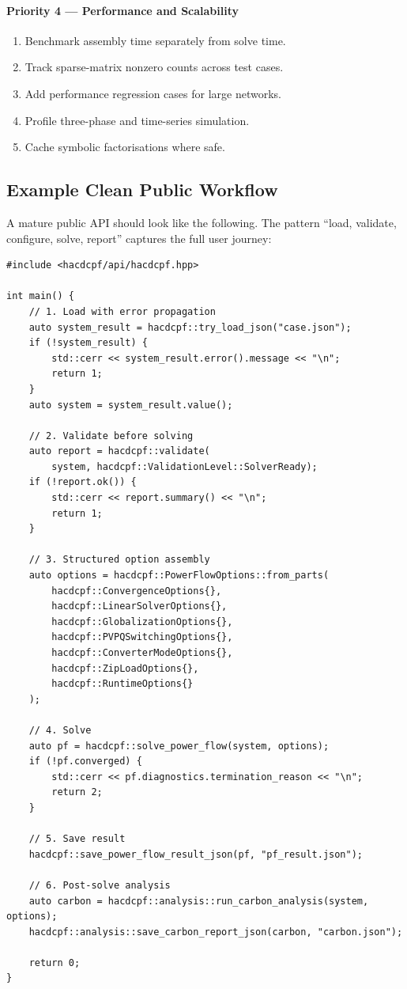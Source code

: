 \paragraph{Priority 4 --- Performance and Scalability}
\begin{enumerate}
  \item Benchmark assembly time separately from solve time.
  \item Track sparse-matrix nonzero counts across test cases.
  \item Add performance regression cases for large networks.
  \item Profile three-phase and time-series simulation.
  \item Cache symbolic factorisations where safe.
\end{enumerate}

\subsection{Example Clean Public Workflow}
\label{sec:example-workflow}

A mature public API should look like the following.  The pattern
``load, validate, configure, solve, report'' captures the full user
journey:

\begin{verbatim}
#include <hacdcpf/api/hacdcpf.hpp>

int main() {
    // 1. Load with error propagation
    auto system_result = hacdcpf::try_load_json("case.json");
    if (!system_result) {
        std::cerr << system_result.error().message << "\n";
        return 1;
    }
    auto system = system_result.value();

    // 2. Validate before solving
    auto report = hacdcpf::validate(
        system, hacdcpf::ValidationLevel::SolverReady);
    if (!report.ok()) {
        std::cerr << report.summary() << "\n";
        return 1;
    }

    // 3. Structured option assembly
    auto options = hacdcpf::PowerFlowOptions::from_parts(
        hacdcpf::ConvergenceOptions{},
        hacdcpf::LinearSolverOptions{},
        hacdcpf::GlobalizationOptions{},
        hacdcpf::PVPQSwitchingOptions{},
        hacdcpf::ConverterModeOptions{},
        hacdcpf::ZipLoadOptions{},
        hacdcpf::RuntimeOptions{}
    );

    // 4. Solve
    auto pf = hacdcpf::solve_power_flow(system, options);
    if (!pf.converged) {
        std::cerr << pf.diagnostics.termination_reason << "\n";
        return 2;
    }

    // 5. Save result
    hacdcpf::save_power_flow_result_json(pf, "pf_result.json");

    // 6. Post-solve analysis
    auto carbon = hacdcpf::analysis::run_carbon_analysis(system, options);
    hacdcpf::analysis::save_carbon_report_json(carbon, "carbon.json");

    return 0;
}
\end{verbatim}

